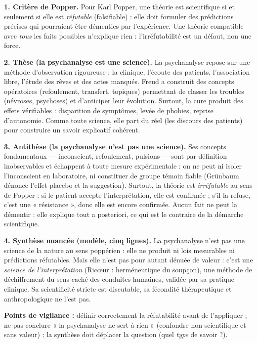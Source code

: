\documentclass[11pt]{article}
\begin{document}
\begin{corrige}
\textbf{1. Critère de Popper.} Pour Karl Popper, une théorie est scientifique si et seulement si elle est \emph{réfutable} (falsifiable) : elle doit formuler des prédictions précises qui pourraient être démenties par l'expérience. Une théorie compatible avec \emph{tous} les faits possibles n'explique rien : l'irréfutabilité est un défaut, non une force.

\textbf{2. Thèse (la psychanalyse est une science).} La psychanalyse repose sur une méthode d'observation rigoureuse : la clinique, l'écoute des patients, l'association libre, l'étude des rêves et des actes manqués. Freud a construit des concepts opératoires (refoulement, transfert, topiques) permettant de classer les troubles (névroses, psychoses) et d'anticiper leur évolution. Surtout, la cure produit des effets vérifiables : disparition de symptômes, levée de phobies, reprise d'autonomie. Comme toute science, elle part du réel (les discours des patients) pour construire un savoir explicatif cohérent.

\textbf{3. Antithèse (la psychanalyse n'est pas une science).} Ses concepts fondamentaux — inconscient, refoulement, pulsions — sont par définition inobservables et échappent à toute mesure expérimentale : on ne peut ni isoler l'inconscient en laboratoire, ni constituer de groupe témoin fiable (Grünbaum dénonce l'effet placebo et la suggestion). Surtout, la théorie est \emph{irréfutable} au sens de Popper : si le patient accepte l'interprétation, elle est confirmée ; s'il la refuse, c'est une « résistance », donc elle est encore confirmée. Aucun fait ne peut la démentir : elle explique tout a posteriori, ce qui est le contraire de la démarche scientifique.

\textbf{4. Synthèse nuancée (modèle, cinq lignes).} La psychanalyse n'est pas une science de la nature au sens poppérien : elle ne produit ni lois mesurables ni prédictions réfutables. Mais elle n'est pas pour autant dénuée de valeur : c'est une \emph{science de l'interprétation} (Ricœur : herméneutique du soupçon), une méthode de déchiffrement du sens caché des conduites humaines, validée par sa pratique clinique. Sa scientificité stricte est discutable, sa fécondité thérapeutique et anthropologique ne l'est pas.

\textbf{Points de vigilance :} définir correctement la réfutabilité avant de l'appliquer ; ne pas conclure « la psychanalyse ne sert à rien » (confondre non-scientifique et sans valeur) ; la synthèse doit déplacer la question (quel \emph{type} de savoir ?).
\end{corrige}
\end{document}
